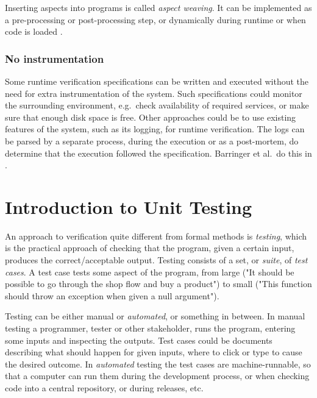 \documentclass[a4paper,11pt]{kth-mag}
\theoremstyle{definition}
\begin{document}
Inserting aspects into programs is called \textit{aspect weaving}. It can be
implemented as a pre-processing or post-processing step, or dynamically during
runtime or when code is loaded \cite{kiczales01aspect, matusiak09aoppy}.


\subsection{No instrumentation}

Some runtime verification specifications can be written and executed without
the need for extra instrumentation of the system. Such specifications could
monitor the surrounding environment, e.g.\ check availability of required
services, or make sure that enough disk space is free. Other approaches could be
to use existing features of the system, such as its logging, for runtime
verification. The logs can be parsed by a separate process, during the
execution or as a post-mortem, do determine that the execution followed the
specification. Barringer et al.\ do this in \cite{barringer09tutorial}.






\pagestyle{newchap}
\chapter{Introduction to Unit Testing} \label{chapter-intro-to-unit-testing}

An approach to verification quite different from formal methods is
\emph{testing}, which is the practical approach of checking that the program,
given a certain input, produces the correct/acceptable output. Testing consists
of a set, or \textit{suite}, of \textit{test cases}. A test case tests some
aspect of the program, from large ("It should be possible to go through the
shop flow and buy a product") to small ("This function should throw an
exception when given a null argument").

Testing can be either manual or \textit{automated}, or something in between. In
manual testing a programmer, tester or other stakeholder, runs the program,
entering some inputs and inspecting the outputs. Test cases could be documents
describing what should happen for given inputs, where to click or type to cause
the desired outcome. In \textit{automated} testing the test cases are
machine-runnable, so that a computer can run them during the development
process, or when checking code into a central repository, or during releases,
etc.
\end{document}
